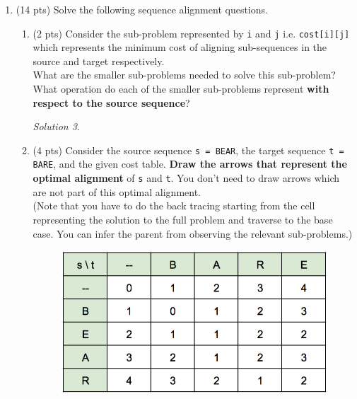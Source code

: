 \documentclass[12pt]{article}
\theoremstyle{remark}
\newtheorem*{solution}{Solution}
\begin{document}
\begin{enumerate}
\begin{enumerate}
\begin{solution}
\end{solution}
\item (2 pts) Show which requests are selected in the optimal solution and the value of the solution. Provide a 2-3 sentence explanation of how you retrieved the solution using the arrows you drew.

\begin{solution}

\end{solution}
\end{enumerate}

\pagebreak
\item (14 pts) Solve the following sequence alignment questions.

\begin{enumerate}
    \item (2 pts) Consider the sub-problem represented by \texttt{i} and \texttt{j}  i.e. \texttt{cost[i][j]} which represents the minimum cost of aligning sub-sequences in the source and target respectively.\\
    What are the smaller sub-problems needed to solve this sub-problem? \\What operation do each of the smaller sub-problems represent \textbf{with respect to the source sequence}?
    \begin{solution}
    
    \end{solution}
    
    \pagebreak
    \item (4 pts) Consider the source sequence \texttt{s = BEAR}, the target sequence \texttt{t = BARE}, 
    and the given cost table. \textbf{Draw the arrows that represent the optimal alignment} of \texttt{s} and \texttt{t}. You don't need to draw arrows which are not part of this optimal alignment.
    \\(Note that you have to do the back tracing starting from the cell representing the solution to the full problem and traverse to the base case. You can infer the parent from observing the relevant sub-problems.)  
    
    \begin{figure}[h!]
    \begin{center}
    \includegraphics[scale=0.6]{PS10a_Q2.png}
    \end{center}
    \end{figure}
    

\end{enumerate}
\end{enumerate}
\end{document}
